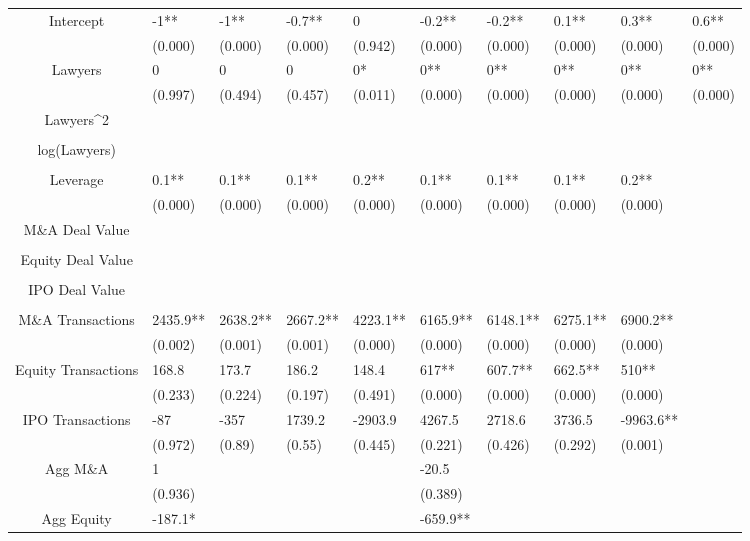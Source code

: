\documentclass{article}
\begin{document}
\begin{table}[H]
\begin{tabular}{|clllllllll|}
Intercept & -1** & -1** & -0.7** & 0 & -0.2** & -0.2** & 0.1** & 0.3** & 0.6** \\ 
   & (0.000) & (0.000) & (0.000) & (0.942) & (0.000) & (0.000) & (0.000) & (0.000) & (0.000) \\ 
  Lawyers & 0 & 0 & 0 & 0* & 0** & 0** & 0** & 0** & 0** \\ 
   & (0.997) & (0.494) & (0.457) & (0.011) & (0.000) & (0.000) & (0.000) & (0.000) & (0.000) \\ 
  Lawyers^2 &  &  &  &  &  &  &  &  &  \\ 
   &  &  &  &  &  &  &  &  &  \\ 
  log(Lawyers) &  &  &  &  &  &  &  &  &  \\ 
   &  &  &  &  &  &  &  &  &  \\ 
  Leverage & 0.1** & 0.1** & 0.1** & 0.2** & 0.1** & 0.1** & 0.1** & 0.2** &  \\ 
   & (0.000) & (0.000) & (0.000) & (0.000) & (0.000) & (0.000) & (0.000) & (0.000) &  \\ 
  M\&A Deal Value &  &  &  &  &  &  &  &  &  \\ 
   &  &  &  &  &  &  &  &  &  \\ 
  Equity Deal Value &  &  &  &  &  &  &  &  &  \\ 
   &  &  &  &  &  &  &  &  &  \\ 
  IPO Deal Value &  &  &  &  &  &  &  &  &  \\ 
   &  &  &  &  &  &  &  &  &  \\ 
  M\&A Transactions & 2435.9** & 2638.2** & 2667.2** & 4223.1** & 6165.9** & 6148.1** & 6275.1** & 6900.2** &  \\ 
   & (0.002) & (0.001) & (0.001) & (0.000) & (0.000) & (0.000) & (0.000) & (0.000) &  \\ 
  Equity Transactions & 168.8 & 173.7 & 186.2 & 148.4 & 617** & 607.7** & 662.5** & 510** &  \\ 
   & (0.233) & (0.224) & (0.197) & (0.491) & (0.000) & (0.000) & (0.000) & (0.000) &  \\ 
  IPO Transactions & -87 & -357 & 1739.2 & -2903.9 & 4267.5 & 2718.6 & 3736.5 & -9963.6** &  \\ 
   & (0.972) & (0.89) & (0.55) & (0.445) & (0.221) & (0.426) & (0.292) & (0.001) &  \\ 
  Agg M\&A & 1 &  &  &  & -20.5 &  &  &  &  \\ 
   & (0.936) &  &  &  & (0.389) &  &  &  &  \\ 
  Agg Equity & -187.1* &  &  &  & -659.9** &  &  &  &  \\ 

\end{tabular}
\end{table}
\end{document}
